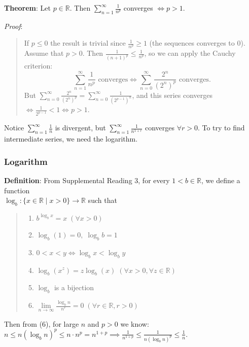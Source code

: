 \documentclass[11pt]{article}
\begin{document}
\textbf{Theorem}: Let $p \in \mathbb{R}$. Then $\sum_{n=1}^\infty \frac{1}{n^p}$ converges $\iff p > 1$.

\emph{Proof}:
\begin{quote}\vspace{-0.3cm}
If $p \leq 0$ the result is trivial since $\frac{1}{n^p} \geq 1$ (the sequences converges to 0). Assume that $p > 0$. Then $\frac{1}{(n+1)^p} \leq \frac{1}{n^p}$, so we can apply the Cauchy criterion:
\begin{displaymath}
\sum_{n=1}^\infty \frac{1}{n^p} \text{ converges} \iff \sum_{n=0}^\infty \frac{2^n}{(2^n)^p} \text{ converges.}
\end{displaymath}
But $\sum_{n=0}^\infty \frac{2^n}{(2^n)^p} = \sum_{n=0}^\infty \frac{1}{(2^{p-1})^n}$, and this series converges $\iff \frac{1}{2^{p-1}} < 1 \iff p > 1$.
\end{quote}

Notice $\sum_{n=1}^\infty \frac{1}{n}$ is divergent, but $\sum_{n=1}^\infty \frac{1}{n^{1+r}}$ converges $\forall r > 0$. To try to find intermediate series, we need the logarithm.

\subsubsection{Logarithm}

\textbf{Definition}: From Supplemental Reading 3, for every $1 < b \in \mathbb{R}$, we define a function\\
$\log_b : \{x \in \mathbb{R} \mid x > 0 \} \to \mathbb{R}$ such that
\begin{quote}\vspace{-0.3cm}
	\begin{enumerate}
	\item $b^{\log_b x} = x \;(\forall x > 0)$
	\item $\log_b(1) = 0,\; \log_b b = 1$
	\item $0 < x < y \iff \log_b x < \log_b y$
	\item $\log_b (x^z) = z \log_b (x) \;(\forall x > 0, \forall z \in \mathbb{R})$
	\item $\log_b$ is a bijection
	\item $\lim\limits_{n \to \infty} \frac{\log_b n}{n^r} = 0 \;(\forall r \in \mathbb{R}, r > 0)$
	\end{enumerate}
\end{quote}
Then from (6), for large $n$ and $p > 0$ we know:\\
$n \leq n (\log_b n)^p \leq n \cdot n^p = n^{1+p} \implies \frac{1}{n^{1+p}} \leq \frac{1}{n (\log_b n)^p} \leq \frac{1}{n}$.
\end{document}
